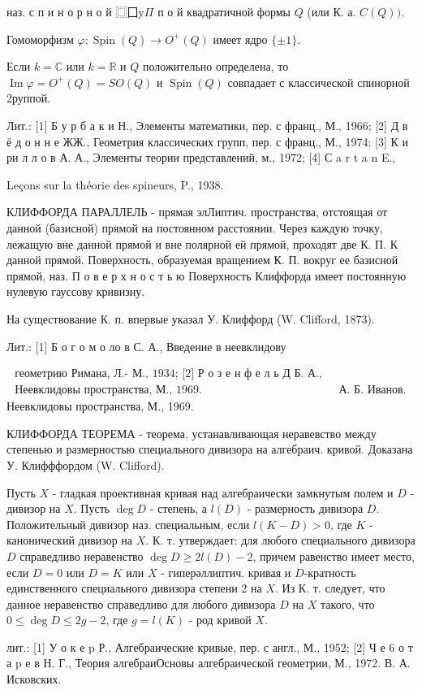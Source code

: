\documentclass[10pt]{article}
\begin{document}
наз. с п и н о р н о й $\mathbf{⿴ 囗} \mathrm{y} \Pi$ п о й квадратичной формы $Q$ (или К. а. $C(Q))$.



Гомоморфизм $\varphi: \operatorname{Spin}(Q) \rightarrow O^{+}(Q)$ имеет ядро $\{ \pm 1\}$.



Если $k=\mathbb{C}$ или $k=\mathbb{R}$ и $Q$ положительно определена, то $\operatorname{Im} \varphi=O^{+}(Q)=S O(Q)$ и $\operatorname{Spin}(Q)$ совпадает с классической спинорной 2руппой.



Лит.: [1] Б у р б а к и Н., Элементы математики, пер. с франц., М., 1966; [2] Д в ё д о н н е ЖЖ., Геометрия классических групп, пер. с франц., М., 1974; [3] К и ри л л о в А. А., Элементы теории представлений, м., 1972; [4] С a r t a n E.,

Leçons sur la théorie des spineurs, P., 1938.



КЛИФФОРДА ПАРАЛЛЕЛЬ - прямая элЛиптич. пространства, отстоящая от данной (базисной) прямой на постоянном расстоянии. Через каждую точку, лежащую вне данной прямой и вне полярной ей прямой, проходят две К. П. К данной прямой. Поверхность, образуемая вращением К. П. вокруг ее базисной прямой, наз. П о в е р х н о с т ь ю Поверхность Клиффорда имеет постоянную нулевую гауссову кривизну.



На существование К. п. впервые указал У. Клиффорд (W. Clifford, 1873).



Лит.: [1] Б о г о м о ло в С. А., Введение в неевклидову



$\begin{array}{ll}\text { геометрию Римана, Л.- М., 1934; [2] Р о з е н ф е л ь Д Б. А., } \\ \text { Неевклидовы пространства, М., 1969. } & \text { А. Б. Иванов. }\end{array}$ Неевклидовы пространства, М., 1969.



КЛИФФОРДА ТЕОРЕМА - теорема, устанавливающая неравевство между степенью и размерностью специального дивизора на алгебраич. кривой. Доказана У. Клифффордом (W. Clifford).



Пусть $X$ - гладкая проективная кривая над алгебраически замкнутым полем и $D$ - дивизор на $X$. Пусть $\operatorname{deg} D$ - степень, а $l(D)$ - размерность дивизора $D$. Положительный дивизор наз. специальным, если $l(K-D)>0$, где $K$ - канонический дивизор на $X$. К. т. утверждает: для любого специального дивизора $D$ справедливо неравенство $\operatorname{deg} D \geqslant 2 l(D)-2$, причем равенство имеет место, если $D=0$ или $D=K$ или $X$ - гиперәллиптич. кривая и $D$-кратность единственного специального дивизора степени 2 на $X$. Из К. т. следует, что данное неравенство справедливо для любого дивизора $D$ на $X$ такого, что $0 \leqslant \operatorname{deg} D \leqslant 2 g-2$, где $g=l(K)$ - род кривой $X$.



лит.: [1] У о к е p Р., Алгебраические кривые, пер. с англ., М., 1952; [2] Ч е 6 о т а p е в Н. Г., Теория алгебраиОсновы алгебраической геометрии, М., 1972. В. А. Исковских.
\end{document}
